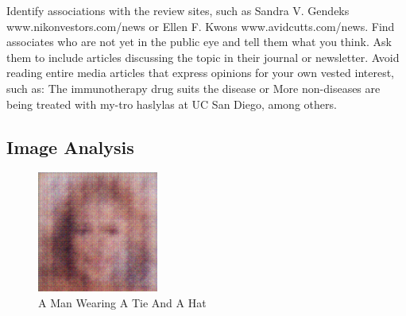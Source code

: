 \documentclass{article}%
\begin{document}
 Identify associations with the review sites, such as Sandra V. Gendeks www.nikonvestors.com/news or Ellen F. Kwons www.avidcutts.com/news. Find associates who are not yet in the public eye and tell them what you think. Ask them to include articles discussing the topic in their journal or newsletter.\newline%
 Avoid reading entire media articles that express opinions for your own vested interest, such as: The immunotherapy drug suits the disease or More non{-}diseases are being treated with my{-}tro haslylas at UC San Diego, among others.

%
\subsection{Image Analysis}%
\label{subsec:ImageAnalysis}%


\begin{figure}[h!]%
\centering%
\includegraphics[width=150px]{500_fake_images/samples_5_39.png}%
\caption{A Man Wearing A Tie And A Hat}%
\end{figure}

%
\end{document}
